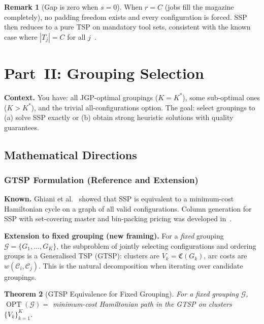 \documentclass[11pt,a4paper]{article}
\theoremstyle{plain}
\newtheorem{theorem}{Theorem}[section]
\theoremstyle{definition}
\newtheorem{remark}[theorem]{Remark}
\DeclareMathOperator{\OPT}{OPT}
\newcommand{\Cconf}{\mathfrak{C}}
\newcommand{\calG}{\mathcal{G}}
\newcommand{\Kstar}{K^{*}}
\newcommand{\sw}[2]{w(#1,#2)}
\begin{document}
\begin{remark}[Gap is zero when $s=0$]
When $r=C$ (jobs fill the magazine completely), no padding freedom exists and every
configuration is forced. SSP then reduces to a pure TSP on mandatory tool sets,
consistent with the known case where $|T_j|=C$ for all $j$~\cite{Ghiani2007}.
\end{remark}

\section{Part~II: Grouping Selection}
\label{sec:partII}

\noindent\textbf{Context.}
You have: all JGP-optimal groupings ($K=\Kstar$), some sub-optimal ones ($K>\Kstar$),
and the trivial all-configurations option.
The goal: select groupings to (a) solve SSP exactly or (b) obtain strong heuristic
solutions with quality guarantees.

\subsection{Mathematical Directions}

\subsubsection{GTSP Formulation (Reference and Extension)}
\label{sec:GTSP}

\noindent\textbf{Known.}
Ghiani et al.~\cite{Ghiani2007} showed that SSP is equivalent to a minimum-cost
Hamiltonian cycle on a graph of all valid configurations.
Column generation for SSP with set-covering master and bin-packing pricing was
developed in~\cite{daSilva2021}.

\medskip
\noindent\textbf{Extension to fixed grouping (new framing).}
For a \emph{fixed} grouping $\calG=\{G_1,\ldots,G_K\}$, the subproblem of jointly
selecting configurations and ordering groups is a Generalised TSP (GTSP):
clusters are $V_k=\Cconf(G_k)$, arc costs are $\sw{\mathcal{C}_i}{\mathcal{C}_j}$.
This is the natural decomposition when iterating over candidate groupings.

\begin{thmbox}
\begin{theorem}[GTSP Equivalence for Fixed Grouping]
\label{thm:GTSP}
For a fixed grouping $\calG$, $\OPT(\calG)=$ minimum-cost Hamiltonian path
in the GTSP on clusters $\{V_k\}_{k=1}^K$.
\end{theorem}
\end{thmbox}
\end{document}

